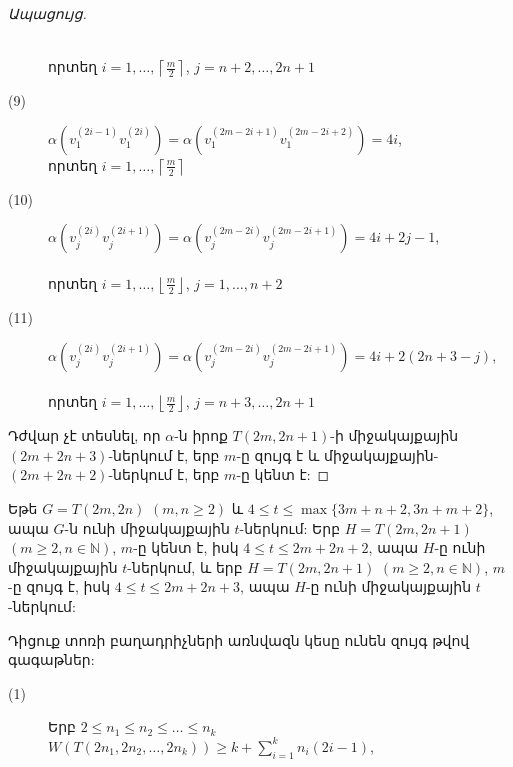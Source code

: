 \begin{hide}
\begin{proof}[Ապացույց]
\begin{description}
\\ որտեղ $i=1,\ldots,\left\lceil\frac{m}{2}\right\rceil$, $j=n+2,\ldots,2n+1$
\item[(9)] 
$\alpha\left(v_{1}^{(2i-1)}v_{1}^{(2i)}\right)=\alpha\left(v_{1}^{(2m-2i+1)}v_{1}^{(2m-2i+2)}\right)=4i$, \\ որտեղ $i=1,\ldots,\left\lceil\frac{m}{2}\right\rceil$
\item[(10)] 
$\alpha\left(v_{j}^{(2i)}v_{j}^{(2i+1)}\right)=\alpha\left(v_{j}^{(2m-2i)}v_{j}^{(2m-2i+1)}\right)=4i+2j-1$, \\
\\ որտեղ $i=1,\ldots,\left\lfloor\frac{m}{2}\right\rfloor$, $j=1,\ldots,n+2$
\item[(11)] 
$\alpha\left(v_{j}^{(2i)}v_{j}^{(2i+1)}\right)=\alpha\left(v_{j}^{(2m-2i)}v_{j}^{(2m-2i+1)}\right)=4i+2(2n+3-j)$,\\ 
 \\ որտեղ $i=1,\ldots,\left\lfloor\frac{m}{2}\right\rfloor$, $j=n+3,\ldots,2n+1$
\end{description}
Դժվար չէ տեսնել, որ $\alpha$-ն իրոք $T(2m,2n+1)$-ի միջակայքային $(2m+2n+3)$-ներկում է, երբ $m$-ը զույգ է և միջակայքային-$(2m+2n+2)$-ներկում է, երբ $m$-ը կենտ է:
\end{proof}

\begin{corollary}
\label{t2_torus} Եթե $G=T(2m,2n)$ $(m,n\geq 2)$ և $4\leq t\leq \max\{3m+n+2,3n+m+2\}$, ապա $G$-ն ունի միջակայքային $t$-ներկում: Երբ $H=T(2m,2n+1)$ $(m\geq 2, n\in\mathbb{N})$, $m$-ը կենտ է, իսկ $4\leq t\leq 2m+2n+2$, ապա $H$-ը ունի միջակայքային $t$-ներկում, և երբ $H=T(2m,2n+1)$ $(m\geq 2, n\in\mathbb{N})$, $m$-ը զույգ է, իսկ $4\leq t\leq 2m+2n+3$, ապա $H$-ը ունի միջակայքային $t$-ներկում:
\end{corollary}

\begin{theorem}
\label{t2_n_torus}
Դիցուք տոռի բաղադրիչների առնվազն կեսը ունեն զույգ թվով գագաթներ:
\begin{description}
\item[(1)] Երբ $2 \leq n_1 \leq n_2 \leq \ldots \leq n_k$\\
$W\left( {T(2{n_1},2{n_2},\ldots,2{n_k})} \right) \ge k + \sum\limits_{i = 1}^k {{n_i}(2i-1)}$,


\end{description}
\end{theorem}
\end{hide}
